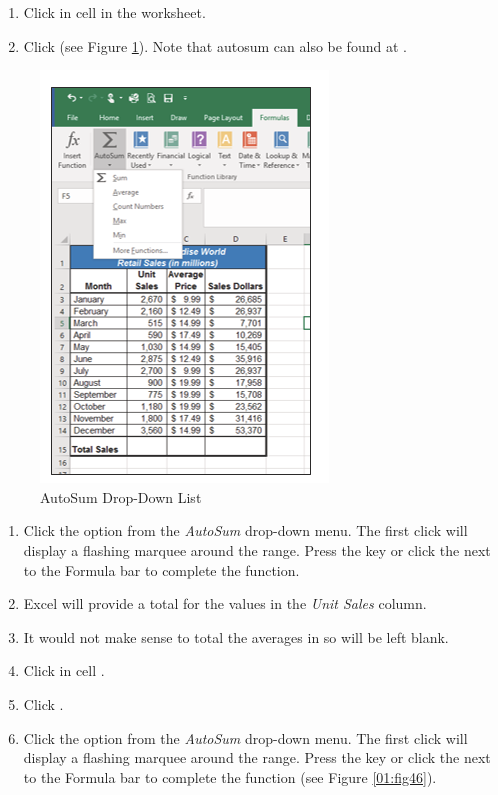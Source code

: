 \begin{enumerate}
	\item Click in cell  in the  worksheet.
	\item Click  (see Figure \ref{01:fig45}). Note that autosum can also be found at .
\end{enumerate}

\begin{figure}[H]
	\centering
	\includegraphics[width=\maxwidth{.95\linewidth}]{gfx/ch01_fig45}
	\caption{AutoSum Drop-Down List}
	\label{01:fig45}
\end{figure}

\begin{enumerate}[resume]
	\item Click the  option from the \textit{AutoSum} drop-down menu. The first click will display a flashing marquee around the range. Press the  key or click the  next to the Formula bar to complete the function.
	\item Excel will provide a total for the values in the \textit{Unit Sales} column.
	\item It would not make sense to total the averages in  so  will be left blank.
	\item Click in cell . 
	\item Click . 
	\item Click the  option from the \textit{AutoSum} drop-down menu. The first click will display a flashing marquee around the range. Press the  key or click the  next to the Formula bar to complete the function (see Figure \ref{01:fig46}).
\end{enumerate}

